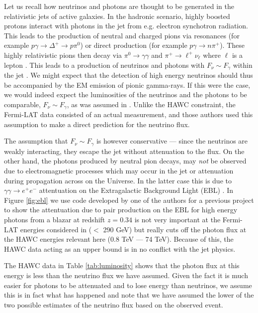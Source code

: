 \documentclass[11pt]{article}
\numberwithin{equation}{section}
\numberwithin{figure}{section}
\numberwithin{table}{section}
\begin{document}
Let us recall how neutrinos and photons are thought to be generated in the relativistic jets of active galaxies. In the hadronic scenario, highly boosted protons interact with photons in the jet from e.g. electron synchotron radiation. This leads to the production of neutral and charged pions via resonances (for example $p\gamma \rightarrow \Delta^+ \rightarrow p\pi^0$) or direct production (for example $p\gamma \rightarrow n\pi^+$). These highly relativistic pions then decay via $\pi^0 \rightarrow \gamma \gamma$ and $\pi^+ \rightarrow \ell^+ \nu_\ell$ where $\ell$ is a lepton \cite{Mucke:1998mk, Szabo:1994qx}. This leads to a production of neutrinos and photons with $F_\nu \sim F_\gamma$ within the jet \cite{Keivani2018}. We might expect that the detection of high energy neutrinos should thus be accompanied by the EM emission of pionic gamma-rays. If this were the case, we would indeed expect the luminosities of the neutrinos and the photons to be comparable, $F_\nu \sim F_\gamma$, as was assumed in \cite{Kelly}.  Unlike the HAWC constraint, the Fermi-LAT data consisted of an actual measurement, and those authors used this assumption to make a direct prediction for the neutrino flux.

The assumption that $F_\nu \sim F_\gamma$ is however conservative --- since the neutrinos are weakly interacting, they escape the jet without attenuation to the flux. On the other hand, the photons produced by neutral pion decays, may \textit{not} be observed due to electromagnetic processes which may occur in the jet or attenuation during propagation across on the Universe. In the latter case this is due to $\gamma\gamma \rightarrow e^+ e^-$ attentuation on the Extragalactic Background Light (EBL) \cite{Finke:2009xi}.  In Figure \ref{fig:ebl} we use code developed by one of the authors for a previous project \cite{DeLavallaz:2011ju} to show the attentuation due to pair production on the EBL for high energy photons from a blazar at redshift $z=0.34$ is not very important at the Fermi-LAT energies considered in \cite{Kelly} ($<$ 290 GeV) but really cuts off the photon flux at the HAWC energies relevant here (0.8 TeV --- 74 TeV). Because of this, the HAWC data acting as an upper bound is in no conflict with the jet physics.

The HAWC data in Table \ref{tab:luminosity} shows that the photon flux at this energy is less than the neutrino flux we have assumed.  Given the fact it is much easier for photons to be attenuated and to lose energy than neutrinos, we assume this is in fact what has happened and note that we have assumed the lower of the two possible estimates of the neutrino flux based on the observed event.
\end{document}
